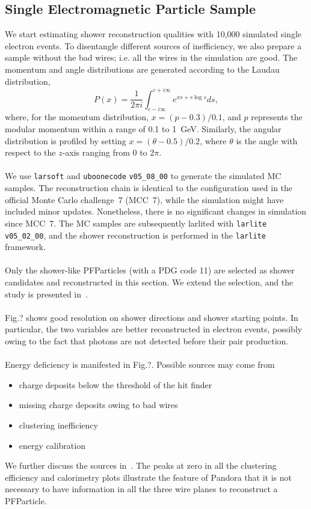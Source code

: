 \subsection{Single Electromagnetic Particle Sample}
\label{sec:single_em}

We start estimating shower reconstruction qualities with 10,000 simulated
single electron events.
To disentangle different sources of inefficiency, we also prepare a sample
without the bad wires; 
i.e. all the wires in the simulation are good.
The momentum and angle distributions are generated according to
the Laudau distribution,
\begin{equation}
\label{eq:bnb-like}
P(x) = \frac{1}{2\pi i}\int^{c+i\infty}_{c-i\infty}e^{xs+s\log s}ds,
\end{equation}
where, for the momentum distribution, $x = (p-0.3)/0.1$, and $p$ 
represents the modular momentum within a range of 0.1 to 1~GeV.
Similarly, the angular distribution is profiled by setting 
$x = (\theta-0.5)/0.2$,
where $\theta$ is the angle with respect to the $z$-axis ranging from
0 to $2\pi$. \\
\\
We use \texttt{larsoft} and \texttt{uboonecode} \texttt{v05\_08\_00} to
generate the simulated MC samples.
The reconstruction chain is identical to the configuration used in 
the official Monte Carlo challenge~7 (MCC~7), while the simulation 
might have included minor updates.
Nonetheless, there is no significant changes in simulation
since MCC~7.
The MC samples are subsequently larlited with \texttt{larlite} 
\texttt{v05\_02\_00}, and the shower reconstruction is performed in the
\texttt{larlite} framework.\\
\\
Only the shower-like PFParticles (with a PDG code 11) are selected
as shower candidates and reconstructed in this section.
We extend the selection, and the study is presented 
in~. \\
\\
Fig.? shows good resolution on shower directions and shower starting
points.
In particular, the two variables are better reconstructed in
electron events, possibly owing to the fact that photons are
not detected before their pair production.\\
\\
Energy deficiency is manifested in Fig.?.
Possible sources may come from
\begin{itemize}
\item charge deposits below the threshold of the hit finder
\item missing charge deposits owing to bad wires
\item clustering inefficiency
\item energy calibration
\end{itemize}
We further discuss the sources in~. 
The peaks at zero in all the clustering efficiency and calorimetry
plots illustrate the feature of Pandora that it is not necessary to
have information in all the three wire planes to reconstruct a 
PFParticle.


